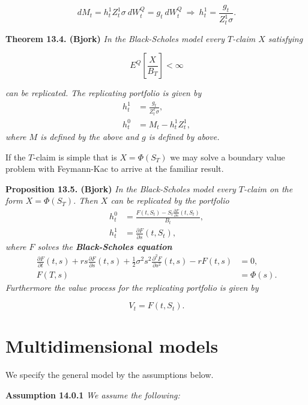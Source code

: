 \documentclass[
]{book}
\begin{document}
\[
dM_t=h_t^1Z_t^1\sigma\ dW_t^Q=g_t\ dW_t^Q\ \Rightarrow\ h_t^1=\frac{g_t}{Z_t^1\sigma}.
\]

\textbf{Theorem 13.4. (Bjork)} \emph{In the Black-Scholes model every \(T\)-claim \(X\) satisfying}

\[
E^Q\left[\frac{X}{B_T}\right]<\infty
\]

\emph{can be replicated. The replicating portfolio is given by}
\begin{align*}
h_t^1&=\frac{g_t}{Z_t^1\sigma},\tag{13.13}\\
h_t^0&=M_t-h_t^1Z_t^1,\tag{13.14}
\end{align*}
\emph{where \(M\) is defined by the above and \(g\) is defined by above.}

If the \(T\)-claim is simple that is \(X=\Phi(S_T)\) we may solve a boundary value problem with Feymann-Kac to arrive at the familiar result.

\textbf{Proposition 13.5. (Bjork)} \emph{In the Black-Scholes model every \(T\)-claim on the form \(X=\Phi(S_T)\). Then \(X\) can be replicated by the portfolio}
\begin{align*}
h_t^0&=\frac{F(t,S_t)-S_t\frac{\partial F}{\partial s}(t,S_t)}{B_t},\tag{13.15}\\
h_t^1&=\frac{\partial F}{\partial s}(t,S_t),\tag{13.15}
\end{align*}
\emph{where \(F\) solves the \textbf{Black-Scholes equation}}
\begin{align*}
\frac{\partial F}{\partial t}(t,s)+rs\frac{\partial F}{\partial s}(t,s)+\frac{1}{2}\sigma^2s^2 \frac{\partial^2 F}{\partial s^2}(t,s)-rF(t,s)&=0,\tag{13.16}\\
F(T,s)&=\Phi(s).\tag{13.16}
\end{align*}
\emph{Furthermore the value process for the replicating portfolio is given by}

\[
V_t=F(t,S_t).
\]

\newpage

\hypertarget{multidimensional-models}{%
\section{Multidimensional models}\label{multidimensional-models}}

We specify the general model by the assumptions below.

\textbf{Assumption 14.0.1} \emph{We assume the following:}
\end{document}
